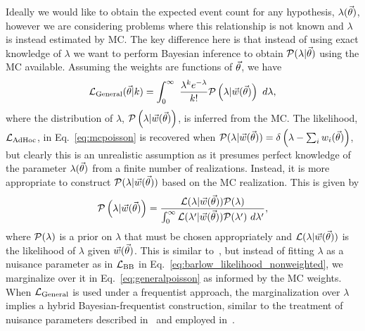 Ideally we would like to obtain the expected event count for any hypothesis, $\lambda(\vec{\theta})$, however we are considering problems where this relationship is not known and $\lambda$ is instead estimated by MC. The key difference here is that instead of using exact knowledge of $\lambda$ we want to perform Bayesian inference to obtain $\mathcal{P}(\lambda|\vec{\theta})$ using the MC available. Assuming the weights are functions of $\vec{\theta}$, we have
\begin{equation} \label{eq:generalpoisson}
\mathcal{L}_{\rm General}(\vec{\theta}|k) = \int_{0}^{\infty}~\frac{\lambda^{k}e^{-\lambda}}{k!}\mathcal{P}\left(\lambda|\vec{w}(\vec{\theta})\right)~d\lambda,
\end{equation}
where the distribution of $\lambda$, $\mathcal{P}\left(\lambda|\vec{w}(\vec{\theta})\right)$, is inferred from the MC. %
The likelihood, $\mathcal{L}_{\textmd{AdHoc}}$, in Eq.~\eqref{eq:mcpoisson} is recovered when $\mathcal{P}(\lambda|\vec{w}(\vec{\theta})) = \delta\left(\lambda - \sum_{i}{w_i(\vec{\theta})}\right)$, but clearly this is an unrealistic assumption as it presumes perfect knowledge of the parameter $\lambda(\vec{\theta})$ from a finite number of realizations. Instead, it is more appropriate to construct $\mathcal{P}(\lambda|\vec{w}(\vec{\theta}))$ based on the MC realization. This is given by
\begin{equation} \label{eq:posterior}
\mathcal{P}\left(\lambda|\vec{w}(\vec{\theta})\right) = \frac{\mathcal{L}(\lambda|\vec{w}(\vec{\theta}))\mathcal{P}(\lambda)}{\int_0^\infty \mathcal{L}(\lambda'|\vec{w}(\vec{\theta}))\mathcal{P}(\lambda')~d\lambda'},
\end{equation}
where $\mathcal{P}(\lambda)$ is a prior on $\lambda$ that must be chosen appropriately and $\mathcal{L}(\lambda|\vec{w}(\vec{\theta}))$ is the likelihood of $\lambda$ given $\vec{w}(\vec{\theta})$. This is similar to~\cite{Barlow:1993dm, Cranmer:2012sba}, but instead of fitting $\lambda$ as a nuisance parameter as in $\mathcal{L}_{\textmd{BB}}$ in Eq.~\eqref{eq:barlow_likelihood_nonweighted}, we marginalize over it in Eq.~\eqref{eq:generalpoisson} as informed by the MC weights. When $\mathcal{L}_{\rm General}$ is used under a frequentist approach, the marginalization over $\lambda$ implies a hybrid Bayesian-frequentist construction, similar to the treatment of nuisance parameters described in~\cite{Cousins:1991qz} and employed in~\cite{Abe:2017vif, Abe:2018wpn}.


